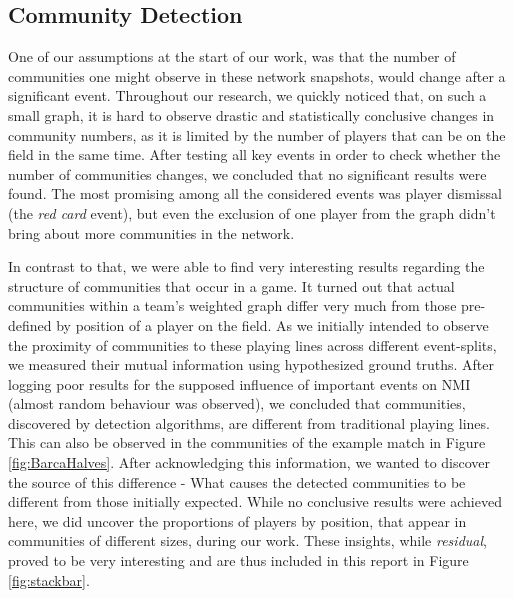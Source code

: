 \documentclass[9pt,twocolumn,twoside]{pnas-report}
\begin{document}
\subsection*{Community Detection}
One of our assumptions at the start of our work, was that the number of communities one might observe in these network snapshots, would change after a significant event. Throughout our research, we quickly noticed that, on such a small graph, it is hard to observe drastic and statistically conclusive changes in community numbers, as it is limited by the number of players that can be on the field in the same time. After testing all key events in order to check whether the number of communities changes, we concluded that no significant results were found. The most promising among all the considered events was player dismissal (the \textit{red card} event), but even the exclusion of one player from the graph didn't bring about more communities in the network.

In contrast to that, we were able to find very interesting results regarding the structure of communities that occur in a game. It turned out that actual communities within a team's weighted graph differ very much from those pre-defined by position of a player on the field. As we initially intended to observe the proximity of communities to these playing lines across different event-splits, we measured their mutual information using hypothesized ground truths.
 After logging poor results for the supposed influence of important events on NMI (almost random behaviour was observed), we concluded that communities, discovered by detection algorithms, are different from traditional playing lines. This can also be observed in the communities of the example match in Figure \ref{fig:BarcaHalves}. 
 After acknowledging this information, we wanted to discover the source of this difference - What causes the detected communities to be different from those initially expected. While no conclusive results were achieved here, we did uncover the proportions of players by position, that appear in communities of different sizes, during our work. These insights, while \textit{residual}, proved to be very interesting and are thus included in this report in Figure \ref{fig:stackbar}.
\end{document}
